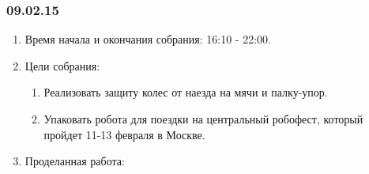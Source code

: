 \subsubsection{09.02.15}
\begin{enumerate}
	
	\item Время начала и окончания собрания: 16:10 - 22:00.
	
	\item Цели собрания: 
	\begin{enumerate}
		
		\item Реализовать защиту колес от наезда на мячи и палку-упор. 
		
		\item Упаковать робота для поездки на центральный робофест, который пройдет 11-13 февраля в Москве.
		
	\end{enumerate}

	\item Проделанная работа:
	\begin{enumerate}
		

\end{enumerate}
\end{enumerate}
